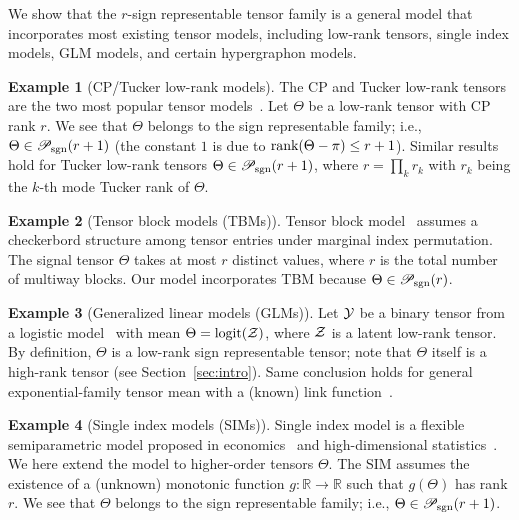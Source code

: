 \documentclass{article}
\theoremstyle{plain}
\theoremstyle{definition}
\newtheorem{example}{Example}
\def\rank{\textup{rank}}
\def\caliP{\mathscr{P}_{\textup{sgn}}}
\begin{document}
We show that the $r$-sign representable tensor family is a general model that incorporates most existing tensor models, including low-rank tensors, single index models, GLM models, and certain hypergraphon models. 

\begin{example}[CP/Tucker low-rank models] The CP and Tucker low-rank tensors are the two most popular tensor models~\cite{kolda2009tensor}. Let $\Theta$ be a low-rank tensor with CP rank $r$. We see that $\Theta$ belongs to the sign representable family; i.e., $\Theta\in\caliP(r+1)$ (the constant $1$ is due to $\rank(\Theta-\pi)\leq r+1$). Similar results hold for Tucker low-rank tensors $\Theta\in\caliP(r+1)$, where $r=\prod_kr_k$ with $r_k$ being the $k$-th mode Tucker rank of $\Theta$.  
\end{example} 

\begin{example}[Tensor block models (TBMs)] Tensor block model~\cite{wang2019multiway,chi2020provable} assumes a checkerbord structure among tensor entries under marginal index permutation. The signal tensor $\Theta$ takes at most $r$ distinct values, where $r$ is the total number of multiway blocks. Our model incorporates TBM because $\Theta \in \caliP(r)$. 
\end{example}


\begin{example}[Generalized linear models (GLMs)] Let $\mathcal{Y}$ be a binary tensor from a logistic model~\cite{wang2018learning} with mean $\Theta=\text{logit}(\mathcal{Z})$, where $\mathcal{Z}$ is a latent low-rank tensor. By definition, $\Theta$ is a low-rank sign representable tensor; note that $\Theta$ itself is a high-rank tensor (see Section~\ref{sec:intro}). Same conclusion holds for general exponential-family tensor mean with a (known) link function~\cite{hong2020generalized}. 
\end{example}

\begin{example}[Single index models (SIMs)] Single index model is a flexible semiparametric model proposed in economics~\cite{robinson1988root} and high-dimensional statistics~\cite{balabdaoui2019least,ganti2017learning}. We here extend the model to higher-order tensors $\Theta$. The SIM assumes the existence of a (unknown) monotonic function $g\colon \mathbb{R}\to \mathbb{R}$ such that $g(\Theta)$ has rank $r$. We see that $\Theta$ belongs to the sign representable family; i.e., $\Theta\in \caliP(r+1)$. 
\end{example}
\end{document}

